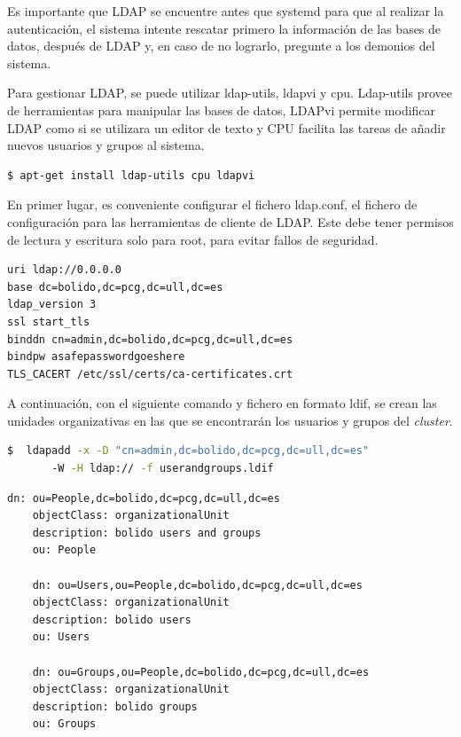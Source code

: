 Es importante que LDAP se encuentre antes que systemd para que al realizar la autenticación, el sistema intente rescatar primero la información de las bases de datos, después de LDAP y, en caso de no lograrlo, pregunte a los demonios del sistema.
\vspace{2mm}

Para gestionar LDAP, se puede utilizar ldap-utils, ldapvi y cpu. Ldap-utils provee de herramientas para manipular las bases de datos, LDAPvi permite modificar LDAP como si se utilizara un editor de texto y CPU facilita las tareas de añadir nuevos usuarios y grupos al sistema.

\vspace{2mm}
\begin{lstlisting}[language=bash]
    $ apt-get install ldap-utils cpu ldapvi
\end{lstlisting}
\vspace{2mm}

En primer lugar, es conveniente configurar el fichero ldap.conf, el fichero de configuración para las herramientas de cliente de LDAP. Este debe tener permisos de lectura y escritura solo para root, para evitar fallos de seguridad.

\begin{lstlisting}[language=bash,caption={Fichero /etc/ldap/ldap.conf},xleftmargin=.25\textwidth]
uri ldap://0.0.0.0
base dc=bolido,dc=pcg,dc=ull,dc=es
ldap_version 3
ssl start_tls
binddn cn=admin,dc=bolido,dc=pcg,dc=ull,dc=es
bindpw asafepasswordgoeshere
TLS_CACERT /etc/ssl/certs/ca-certificates.crt
\end{lstlisting}
\vspace{2mm}

A continuación, con el siguiente comando y fichero en formato ldif, se crean las unidades organizativas en las que se encontrarán los usuarios y grupos del \emph{cluster}.

\vspace{4mm}
\begin{lstlisting}[language=bash]
    $  ldapadd -x -D "cn=admin,dc=bolido,dc=pcg,dc=ull,dc=es" 
       -W -H ldap:// -f userandgroups.ldif
\end{lstlisting}
\vspace{2mm}

\vspace{2mm}
\begin{lstlisting}[language=bash,caption={fichero userandgroups.ldif}]
    dn: ou=People,dc=bolido,dc=pcg,dc=ull,dc=es
    objectClass: organizationalUnit
    description: bolido users and groups
    ou: People
    
    dn: ou=Users,ou=People,dc=bolido,dc=pcg,dc=ull,dc=es
    objectClass: organizationalUnit
    description: bolido users
    ou: Users
    
    dn: ou=Groups,ou=People,dc=bolido,dc=pcg,dc=ull,dc=es
    objectClass: organizationalUnit
    description: bolido groups
    ou: Groups
\end{lstlisting}
\vspace{4mm}

